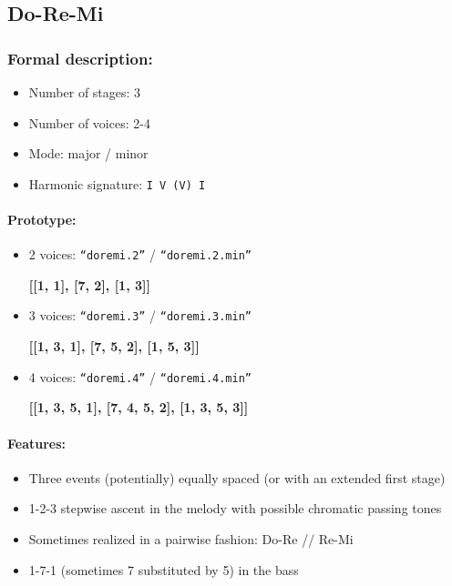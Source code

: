﻿\documentclass[11pt, openany]{article}
\begin{document}
	\subsection{Do-Re-Mi}
	
\subsubsection{Formal description:}
\begin{itemize}
\item Number of stages: 3
\item Number of voices: 2-4
\item Mode: major / minor
\item Harmonic signature: \texttt{I V (V) I}
\end{itemize}

\paragraph{Prototype:}
\begin{itemize}
\item 2 voices: \texttt{“doremi.2”} / \texttt{“doremi.2.min”}
	\begin{center}
    \textbf{[[1, 1], [7, 2], [1, 3]]}
    \end{center}
\item 3 voices: \texttt{“doremi.3”} / \texttt{“doremi.3.min”}
	\begin{center}
    \textbf{[[1, 3, 1], [7, 5, 2], [1, 5, 3]]}
    \end{center}
\item 4 voices: \texttt{“doremi.4”} / \texttt{“doremi.4.min”}
	\begin{center}
    \textbf{[[1, 3, 5, 1], [7, 4, 5, 2], [1, 3, 5, 3]]}
    \end{center}
\end{itemize}

\paragraph{Features:}
\begin{itemize}
\item Three events (potentially) equally spaced (or with an extended first stage)
\item 1-2-3 stepwise ascent in the melody with possible chromatic passing tones
\item Sometimes realized in a pairwise fashion: Do-Re // Re-Mi
\item 1-7-1 (sometimes 7 substituted by 5) in the bass
\end{itemize}
\end{document}
